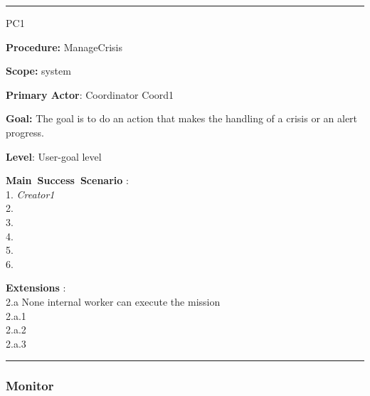 \hrule
\begin{lyxlist}{PC1}
\small{
\item [\textbf{Procedure:}] ManageCrisis
\item [\textbf{Scope:}] system
\item [\textbf{Primary Actor}:] Coordinator Coord1
\item [\textbf{Goal:}] The goal is to do an action that makes the handling of a
crisis or an alert progress.
\item [\textbf{Level}:] User-goal level
\item [\textbf{Main~Success~Scenario}]:\\
1. \emph{Creator1} \\
2. \\
3. \\
4. \\
5. \\
6.


\item [\textbf{Extensions}]:\\
2.a None internal worker can execute the mission\\
\hspace*{0.5cm} 2.a.1 \\
\hspace*{0.5cm} 2.a.2 \\
\hspace*{0.5cm} 2.a.3 \\

}

\end{lyxlist}
\hrule

\subsubsection{Monitor}

